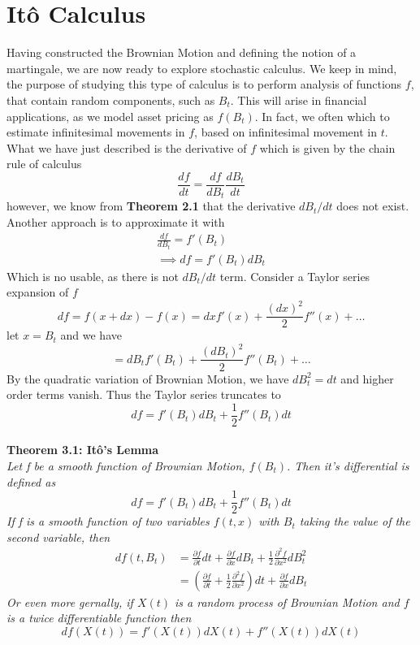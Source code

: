 \documentclass{article}
\begin{document}
\newpage
\section{Itô Calculus}
Having constructed the Brownian Motion and defining the notion of a martingale, we are now ready to explore stochastic calculus. We keep in mind, the purpose of studying this type of calculus is to perform analysis of functions $f$, that contain random components, such as $B_t$. This will arise in financial applications, as we model asset pricing as $f(B_t)$. In fact, we often which to estimate infinitesimal movements in $f$, based on infinitesimal movement in $t$. What we have just described is the derivative of $f$ which is given by the chain rule of calculus
$$\frac{df}{dt} = \frac{df}{dB_t} \frac{dB_t}{dt}$$
however, we know from \textbf{Theorem 2.1} that the derivative $dB_t/dt$ does not exist. Another approach is to approximate it with 
\begin{align*}
    \frac{df}{dB_t} = f'(B_t) \\
    \implies df = f'(B_t)dB_t
\end{align*}
Which is no usable, as there is not $dB_t/dt$ term. Consider a Taylor series expansion of $f$
$$df = f(x+dx)-f(x) = dx f'(x) + \frac{(dx)^2}{2}f''(x) + \dots$$
let $x=B_t$ and we have 
$$= dB_t f'(B_t) + \frac{(dB_t)^2}{2}f''(B_t) + \dots$$
By the quadratic variation of Brownian Motion, we have $dB_t^2 = dt$ and higher order terms vanish. Thus the Taylor series truncates to
$$df = f'(B_t)dB_t + \frac{1}{2}f''(B_t)dt$$
\\
\textbf{Theorem 3.1: Itô's Lemma}\\
\textit{Let f be a smooth function of Brownian Motion, $f(B_t)$. Then it's differential is defined as}
$$df = f'(B_t)dB_t + \frac{1}{2}f''(B_t)dt$$
\textit{If f is a smooth function of two variables $f(t, x)$ with $B_t$ taking the value of the second variable, then }
\begin{align*}
    df(t, B_t) &= \frac{\partial f}{\partial t} dt + \frac{\partial f}{\partial x} dB_t + \frac{1}{2}\frac{\partial^2 f}{\partial x^2}dB_t^2 \\
    &= \left(\frac{\partial f}{\partial t} + \frac{1}{2}\frac{\partial^2 f}{\partial x^2}  \right)dt + \frac{\partial f}{\partial x} dB_t
\end{align*}
\textit{Or even more gernally, if $X(t)$ is a random process of Brownian Motion and $f$ is a twice differentiable function then
$$df(X(t)) = f'(X(t))dX(t) + f''(X(t))dX(t)$$}
\\
\end{document}
